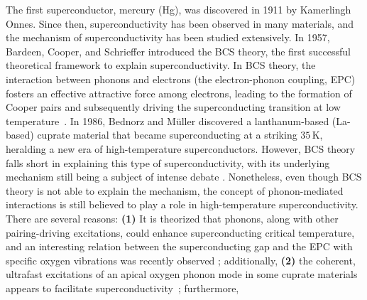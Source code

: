 \documentclass[11pt]{article}
\begin{document}
The first superconductor, mercury (Hg), was discovered in 1911 by Kamerlingh Onnes. Since then, superconductivity has been observed in many materials, and the mechanism of superconductivity has been studied extensively.
In 1957, Bardeen, Cooper, and Schrieffer introduced the BCS theory, the first successful theoretical framework to explain superconductivity\cite{bardeen_theory_1957}. 
In BCS theory, 
the interaction between phonons and electrons (the electron-phonon coupling, EPC) fosters an effective attractive force among electrons, leading to the formation of Cooper pairs and subsequently driving the superconducting transition at low temperature~\cite{bardeen_theory_1957}. 
In 1986, Bednorz and Müller discovered a lanthanum-based (La-based) cuprate material that became superconducting at a striking $35\,\mathrm{K}$\cite{bednorz_possible_1986}, heralding a new era of high-temperature superconductors. 
However, BCS theory falls short in explaining this type of superconductivity, with its underlying mechanism still being a subject of intense debate \cite{keimer_quantum_2015}.
Nonetheless, even though BCS theory is not able to explain the mechanism, the concept of phonon-mediated interactions is still believed to play a role in high-temperature superconductivity. 
There are several reasons: \textbf{(1)} It is theorized that phonons, along with other pairing-driving excitations, could enhance superconducting critical temperature\cite{johnston_systematic_2010}, and an interesting relation between the superconducting gap and the EPC with specific oxygen vibrations was recently observed \cite{he_rapid_2018}; 
additionally, \textbf{(2)} the coherent, ultrafast excitations of an apical oxygen phonon mode in some cuprate materials appears to facilitate superconductivity~\cite{kaiser_optically_2014};
furthermore, 
\end{document}
